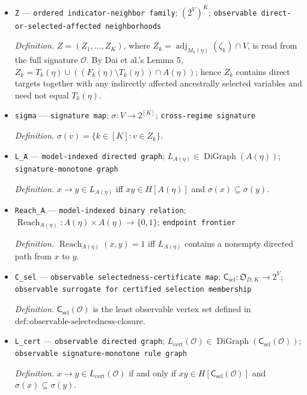 \documentclass{article}
\begin{document}
\begin{itemize}
  \item \texttt{Z} --- \texttt{ordered indicator-\allowbreak{}neighbor family}; \((2^V)^K\); \texttt{observable direct-\allowbreak{}or-\allowbreak{}selected-\allowbreak{}affected neighborhoods}
  \par\smallskip\noindent\emph{Definition.} \(Z=(Z_1,\ldots,Z_K)\), where \(Z_k=\operatorname{adj}_{M_k(\eta)}(\zeta_k)\cap V\), is read from the full signature \(\mathcal O\). By Dai et al.'s Lemma 5, \(Z_k=T_k(\eta)\cup((F_k(\eta)\setminus T_k(\eta))\cap A(\eta))\); hence \(Z_k\) contains direct targets together with any indirectly affected ancestrally selected variables and need not equal \(T_k(\eta)\).
  \item \texttt{sigma} --- \texttt{signature map}; \(\sigma:V\to2^{[K]}\); \texttt{cross-\allowbreak{}regime signature}
  \par\smallskip\noindent\emph{Definition.} \(\sigma(v)=\{k\in[K]:v\in Z_k\}\).
  \item \texttt{L\_\allowbreak{}A} --- \texttt{model-\allowbreak{}indexed directed graph}; \(L_{A(\eta)}\in\operatorname{DiGraph}(A(\eta))\); \texttt{signature-\allowbreak{}monotone graph}
  \par\smallskip\noindent\emph{Definition.} \(x\to y\in L_{A(\eta)}\) iff \(xy\in H[A(\eta)]\) and \(\sigma(x)\subseteq\sigma(y)\).
  \item \texttt{Reach\_\allowbreak{}A} --- \texttt{model-\allowbreak{}indexed binary relation}; \(\operatorname{Reach}_{A(\eta)}:A(\eta)\times A(\eta)\to\{0,1\}\); \texttt{endpoint frontier}
  \par\smallskip\noindent\emph{Definition.} \(\operatorname{Reach}_{A(\eta)}(x,y)=1\) iff \(L_{A(\eta)}\) contains a nonempty directed path from \(x\) to \(y\).
  \item \texttt{C\_\allowbreak{}sel} --- \texttt{observable selectedness-\allowbreak{}certificate map}; \(\mathsf C_{\mathrm{sel}}:\mathfrak O_{D,K}\to 2^V\); \texttt{observable surrogate for certified selection membership}
  \par\smallskip\noindent\emph{Definition.} \(\mathsf C_{\mathrm{sel}}(\mathcal O)\) is the least observable vertex set defined in \(\mathrm{def:observable\mbox{-}selectedness\mbox{-}closure}\).
  \item \texttt{L\_\allowbreak{}cert} --- \texttt{observable directed graph}; \(L_{\mathrm{cert}}(\mathcal O)\in\operatorname{DiGraph}(\mathsf C_{\mathrm{sel}}(\mathcal O))\); \texttt{observable signature-\allowbreak{}monotone rule graph}
  \par\smallskip\noindent\emph{Definition.} \(x\to y\in L_{\mathrm{cert}}(\mathcal O)\) if and only if \(xy\in H[\mathsf C_{\mathrm{sel}}(\mathcal O)]\) and \(\sigma(x)\subseteq\sigma(y)\).

\end{itemize}
\end{document}
